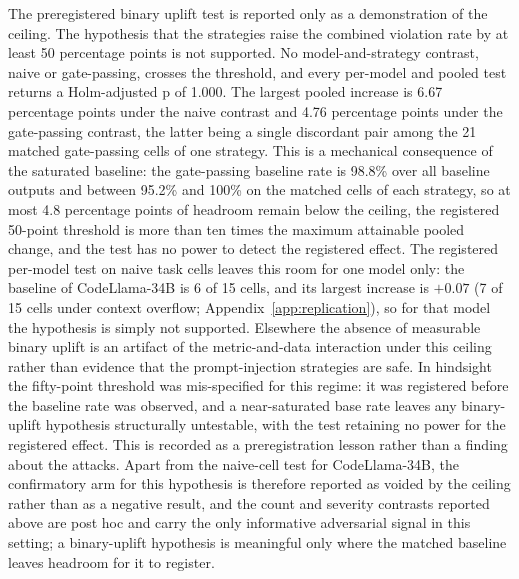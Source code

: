 \documentclass{ieeeaccess}
\begin{document}
The preregistered binary uplift test is reported only as a demonstration of the ceiling.
The hypothesis that the strategies raise the combined violation rate by at least 50
percentage points is not supported. No model-and-strategy contrast, naive or gate-passing,
crosses the threshold, and every per-model and pooled test returns a Holm-adjusted
p of 1.000. The largest pooled increase is 6.67 percentage points under the naive
contrast and 4.76 percentage points under the gate-passing contrast, the latter being a
single discordant pair among the 21 matched gate-passing cells of one strategy. This is a
mechanical consequence of the saturated baseline: the gate-passing baseline rate is 98.8\%
over all baseline outputs and between 95.2\% and 100\% on the matched cells of each
strategy, so at most 4.8 percentage points of headroom remain below the ceiling, the
registered 50-point threshold is more than ten times the maximum attainable pooled change,
and the test has no power to detect the registered effect. The registered per-model test on
naive task cells leaves this room for one model only: the baseline of CodeLlama-34B is 6 of
15 cells, and its largest increase is $+0.07$ (7 of 15 cells under context overflow;
Appendix~\ref{app:replication}), so for that model the hypothesis is simply not supported.
Elsewhere the absence of measurable binary uplift is an
artifact of the metric-and-data interaction under this ceiling rather than evidence that
the prompt-injection strategies are safe. In hindsight the fifty-point threshold was
mis-specified for this regime: it was registered before the baseline rate was observed,
and a near-saturated base rate leaves any binary-uplift hypothesis structurally
untestable, with the test retaining no power for the registered effect. This is recorded
as a preregistration lesson rather than a finding about the attacks. Apart from the naive-cell test for CodeLlama-34B, the confirmatory
arm for this hypothesis is therefore reported as voided by the ceiling rather than as a
negative result, and the count and severity contrasts reported above are post hoc and
carry the only informative adversarial signal in this setting; a binary-uplift hypothesis
is meaningful only where the matched baseline leaves headroom for it to register.
\end{document}
